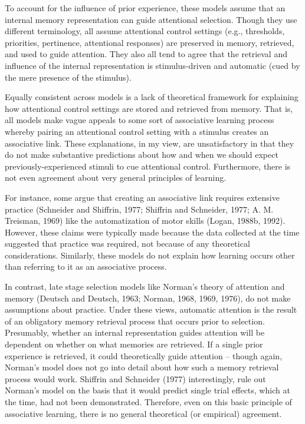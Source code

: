 \documentclass[]{DissertateCUNY}
\begin{document}
To account for the influence of prior experience, these models assume
that an internal memory representation can guide attentional selection.
Though they use different terminology, all assume attentional control
settings (e.g., thresholds, priorities, pertinence, attentional
responses) are preserved in memory, retrieved, and used to guide
attention. They also all tend to agree that the retrieval and influence
of the internal representation is stimulus-driven and automatic (cued by
the mere presence of the stimulus).

Equally consistent across models is a lack of theoretical framework for
explaining how attentional control settings are stored and retrieved
from memory. That is, all models make vague appeals to some sort of
associative learning process whereby pairing an attentional control
setting with a stimulus creates an associative link. These explanations,
in my view, are unsatisfactory in that they do not make substantive
predictions about how and when we should expect previously-experienced
stimuli to cue attentional control. Furthermore, there is not even
agreement about very general principles of learning.

For instance, some argue that creating an associative link requires
extensive practice (Schneider and Shiffrin, 1977; Shiffrin and
Schneider, 1977; A. M. Treisman, 1969) like the automatization of motor
skills (Logan, 1988b, 1992). However, these claims were typically made
because the data collected at the time suggested that practice was
required, not because of any theoretical considerations. Similarly,
these models do not explain how learning occurs other than referring to
it as an associative process.

In contrast, late stage selection models like Norman's theory of
attention and memory (Deutsch and Deutsch, 1963; Norman, 1968, 1969,
1976), do not make assumptions about practice. Under these views,
automatic attention is the result of an obligatory memory retrieval
process that occurs prior to selection. Presumably, whether an internal
representation guides attention will be dependent on whether on what
memories are retrieved. If a single prior experience is retrieved, it
could theoretically guide attention -- though again, Norman's model does
not go into detail about how such a memory retrieval process would work.
Shiffrin and Schneider (1977) interestingly, rule out Norman's model on
the basis that it would predict single trial effects, which at the time,
had not been demonstrated. Therefore, even on this basic principle of
associative learning, there is no general theoretical (or empirical)
agreement.
\end{document}
